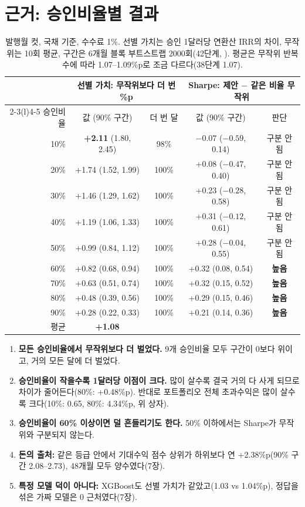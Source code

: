 \section{근거: 승인비율별 결과}
\begin{table}[H]\centering\small
\begin{tabular}{@{}rcccc@{}}\toprule
 & \multicolumn{2}{c}{선별 가치: 무작위보다 더 번 \%p} & \multicolumn{2}{c}{Sharpe: 제안 $-$ 같은 비율 무작위}\\\cmidrule(lr){2-3}\cmidrule(l){4-5}
승인비율 & 값 (90\% 구간) & 더 번 달 & 값 (90\% 구간) & 판단\\\midrule
10\% & \textbf{+2.11} (1.80, 2.45) & 98\% & $-0.07$ ($-0.59$, 0.14) & 구분 안 됨\\
20\% & +1.74 (1.52, 1.99) & 100\% & +0.08 ($-0.47$, 0.40) & 구분 안 됨\\
30\% & +1.46 (1.29, 1.62) & 100\% & +0.23 ($-0.28$, 0.58) & 구분 안 됨\\
40\% & +1.19 (1.06, 1.33) & 100\% & +0.31 ($-0.12$, 0.61) & 구분 안 됨\\
50\% & +0.99 (0.84, 1.12) & 100\% & +0.28 ($-0.04$, 0.55) & 구분 안 됨\\
60\% & +0.82 (0.68, 0.94) & 100\% & +0.32 (0.08, 0.54) & \textbf{높음}\\
70\% & +0.63 (0.51, 0.74) & 100\% & +0.32 (0.15, 0.52) & \textbf{높음}\\
80\% & +0.48 (0.39, 0.56) & 100\% & +0.29 (0.15, 0.46) & \textbf{높음}\\
90\% & +0.28 (0.22, 0.33) & 100\% & +0.21 (0.14, 0.36) & \textbf{높음}\\\midrule
평균 & \textbf{+1.08} & & & \\\bottomrule
\end{tabular}
\caption{발행월 컷, 국채 기준, 수수료 1\%. 선별 가치는 승인 1달러당 연환산 IRR의 차이, 무작위는 10회 평균, 구간은 6개월 블록 부트스트랩 2000회(42단계, ). 평균은 무작위 반복 수에 따라 1.07--1.09\%p로 조금 다르다(38단계 1.07).}
\end{table}
\begin{enumerate}[leftmargin=*]
\item \textbf{모든 승인비율에서 무작위보다 더 벌었다.} 9개 승인비율 모두 구간이 0보다 위이고, 거의 모든 달에 더 벌었다.
\item \textbf{승인비율이 작을수록 1달러당 이점이 크다.} 많이 살수록 결국 거의 다 사게 되므로 차이가 줄어든다(80\%: +0.48\%p). 반대로 포트폴리오 전체 초과수익은 많이 살수록 크다(10\%: 0.65, 80\%: 4.34\%p, 위 상자).
\item \textbf{승인비율이 60\% 이상이면 덜 흔들리기도 한다.} 50\% 이하에서는 Sharpe가 무작위와 구분되지 않는다.
\item \textbf{돈의 출처:} 같은 등급 안에서 기대수익 점수 상위가 하위보다 연 +2.38\%p(90\% 구간 2.08--2.73), 48개월 모두 양수였다(7장).
\item \textbf{특정 모델 덕이 아니다:} XGBoost도 선별 가치가 같았고(1.03 vs 1.04\%p), 정답을 섞은 가짜 모델은 0 근처였다(7장).
\end{enumerate}

